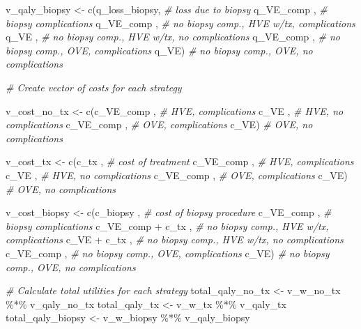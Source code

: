 \documentclass[
]{article}
\newenvironment{Shaded}{\begin{snugshade}}{\end{snugshade}}
\newcommand{\CommentTok}[1]{\textcolor[rgb]{0.56,0.35,0.01}{\textit{#1}}}
\newcommand{\FunctionTok}[1]{\textcolor[rgb]{0.00,0.00,0.00}{#1}}
\newcommand{\NormalTok}[1]{#1}
\newcommand{\OtherTok}[1]{\textcolor[rgb]{0.56,0.35,0.01}{#1}}
\newcommand{\SpecialCharTok}[1]{\textcolor[rgb]{0.00,0.00,0.00}{#1}}
\begin{document}
\begin{Shaded}
\begin{Highlighting}[]
  
\NormalTok{  v\_qaly\_biopsy }\OtherTok{\textless{}{-}} \FunctionTok{c}\NormalTok{(q\_loss\_biopsy, }\CommentTok{\# loss due to biopsy}
\NormalTok{                     q\_VE\_comp    , }\CommentTok{\# biopsy complications}
\NormalTok{                     q\_VE\_comp    , }\CommentTok{\# no biopsy comp., HVE w/tx, complications }
\NormalTok{                     q\_VE         , }\CommentTok{\# no biopsy comp., HVE w/tx, no complications}
\NormalTok{                     q\_VE\_comp    , }\CommentTok{\# no biopsy comp., OVE, complications}
\NormalTok{                     q\_VE)          }\CommentTok{\# no biopsy comp., OVE, no complications}
  
  \CommentTok{\# Create vector of costs for each strategy }
  
\NormalTok{  v\_cost\_no\_tx  }\OtherTok{\textless{}{-}} \FunctionTok{c}\NormalTok{(c\_VE\_comp , }\CommentTok{\# HVE, complications}
\NormalTok{                     c\_VE      , }\CommentTok{\# HVE, no complications}
\NormalTok{                     c\_VE\_comp , }\CommentTok{\# OVE, complications}
\NormalTok{                     c\_VE)       }\CommentTok{\# OVE, no complications}
  
\NormalTok{  v\_cost\_tx     }\OtherTok{\textless{}{-}} \FunctionTok{c}\NormalTok{(c\_tx      , }\CommentTok{\# cost of treatment}
\NormalTok{                     c\_VE\_comp , }\CommentTok{\# HVE, complications}
\NormalTok{                     c\_VE      , }\CommentTok{\# HVE, no complications}
\NormalTok{                     c\_VE\_comp , }\CommentTok{\# OVE, complications}
\NormalTok{                     c\_VE)       }\CommentTok{\# OVE, no complications}
  
  
\NormalTok{  v\_cost\_biopsy }\OtherTok{\textless{}{-}} \FunctionTok{c}\NormalTok{(c\_biopsy         , }\CommentTok{\# cost of biopsy procedure}
\NormalTok{                     c\_VE\_comp        , }\CommentTok{\# biopsy complications}
\NormalTok{                     c\_VE\_comp }\SpecialCharTok{+}\NormalTok{ c\_tx , }\CommentTok{\# no biopsy comp., HVE w/tx, complications }
\NormalTok{                     c\_VE }\SpecialCharTok{+}\NormalTok{ c\_tx      , }\CommentTok{\# no biopsy comp., HVE w/tx, no complications}
\NormalTok{                     c\_VE\_comp        , }\CommentTok{\# no biopsy comp., OVE, complications}
\NormalTok{                     c\_VE)              }\CommentTok{\# no biopsy comp., OVE, no complications}
  
  \CommentTok{\# Calculate total utilities for each strategy }
\NormalTok{  total\_qaly\_no\_tx  }\OtherTok{\textless{}{-}}\NormalTok{ v\_w\_no\_tx  }\SpecialCharTok{\%*\%}\NormalTok{ v\_qaly\_no\_tx      }
\NormalTok{  total\_qaly\_tx     }\OtherTok{\textless{}{-}}\NormalTok{ v\_w\_tx     }\SpecialCharTok{\%*\%}\NormalTok{ v\_qaly\_tx}
\NormalTok{  total\_qaly\_biopsy }\OtherTok{\textless{}{-}}\NormalTok{ v\_w\_biopsy }\SpecialCharTok{\%*\%}\NormalTok{ v\_qaly\_biopsy}
  

\end{Highlighting}
\end{Shaded}
\end{document}
